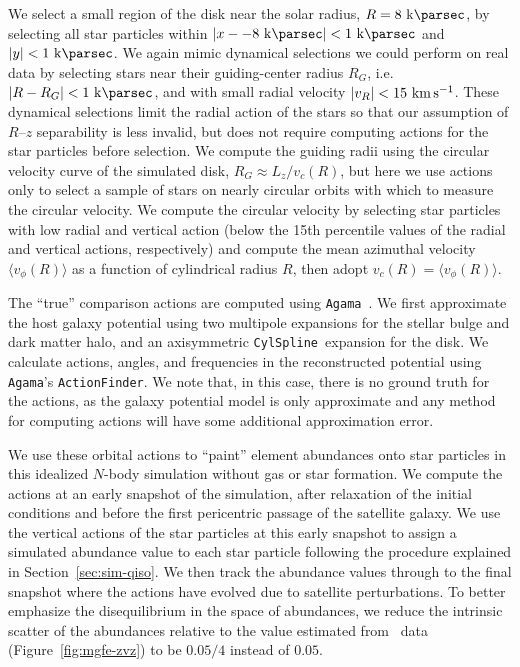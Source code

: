 We select a small region of the disk near the solar radius, $R=8~\kpc$, by selecting all
star particles within $|x - -8~\kpc| < 1~\kpc$ and $|y| < 1~\kpc$.
We again mimic dynamical selections we could perform on real data by selecting stars
near their guiding-center radius $R_G$, i.e. $|R-R_G| < 1~\kpc$, and with small radial
velocity $|v_R| < 15~\kms$.
These dynamical selections limit the radial action of the stars so that our assumption
of $R$--$z$ separability is less invalid, but does not require computing actions for the
star particles before selection.
We compute the guiding radii using the circular velocity curve of the simulated disk,
$R_G \approx L_z / v_c(R)$, but here we use actions only to select a sample of stars on
nearly circular orbits with which to measure the circular velocity.
We compute the circular velocity by selecting star particles with low radial and
vertical action (below the 15th percentile values of the radial and vertical actions,
respectively) and compute the mean azimuthal velocity $\langle v_\phi(R) \rangle$ as a
function of cylindrical radius $R$, then adopt $v_c(R) = \langle v_\phi(R) \rangle$.

The ``true'' comparison actions are computed using \texttt{Agama}\
\citep{Vasiliev:2019}.
We first approximate the host galaxy potential using two multipole expansions for the
stellar bulge and dark matter halo, and an axisymmetric \texttt{CylSpline}\ expansion
for the disk.
We calculate actions, angles, and frequencies in the reconstructed potential using
\texttt{Agama}'s \texttt{ActionFinder}.
We note that, in this case, there is no ground truth for the actions, as the galaxy
potential model is only approximate and any method for computing actions will have some
additional approximation error.

We use these orbital actions to ``paint'' element abundances onto star particles in
this idealized $N$-body simulation without gas or star formation.
We compute the actions at an early snapshot of the simulation, after relaxation of the
initial conditions and before the first pericentric passage of the satellite galaxy.
We use the vertical actions of the star particles at this early snapshot to assign a
simulated \abun{Mg}{Fe} abundance value to each star particle following the procedure
explained in Section~\ref{sec:sim-qiso}.
We then track the abundance values through to the final snapshot where the actions have
evolved due to satellite perturbations.
To better emphasize the disequilibrium in the space of abundances, we reduce the
intrinsic scatter of the abundances relative to the value estimated from \apogee\ data
(Figure~\ref{fig:mgfe-zvz}) to be $0.05 / 4$ instead of $0.05$.

